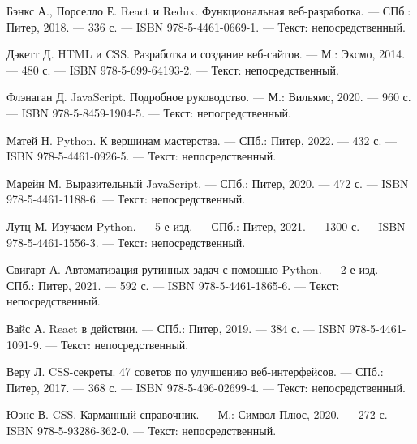 
\begin{thebibliography}{9}

     Бэнкс А., Порселло Е. React и Redux. Функциональная веб-разработка. — СПб.: Питер, 2018. — 336 с. — ISBN 978-5-4461-0669-1. — Текст: непосредственный.

     Дэкетт Д. HTML и CSS. Разработка и создание веб-сайтов. — М.: Эксмо, 2014. — 480 с. — ISBN 978-5-699-64193-2. — Текст: непосредственный.

     Флэнаган Д. JavaScript. Подробное руководство. — М.: Вильямс, 2020. — 960 с. — ISBN 978-5-8459-1904-5. — Текст: непосредственный.

     Матей Н. Python. К вершинам мастерства. — СПб.: Питер, 2022. — 432 с. — ISBN 978-5-4461-0926-5. — Текст: непосредственный.

     Марейн М. Выразительный JavaScript. — СПб.: Питер, 2020. — 472 с. — ISBN 978-5-4461-1188-6. — Текст: непосредственный.

     Лутц М. Изучаем Python. — 5-е изд. — СПб.: Питер, 2021. — 1300 с. — ISBN 978-5-4461-1556-3. — Текст: непосредственный.

     Свигарт А. Автоматизация рутинных задач с помощью Python. — 2-е изд. — СПб.: Питер, 2021. — 592 с. — ISBN 978-5-4461-1865-6. — Текст: непосредственный.

     Вайс А. React в действии. — СПб.: Питер, 2019. — 384 с. — ISBN 978-5-4461-1091-9. — Текст: непосредственный.

     Веру Л. CSS-секреты. 47 советов по улучшению веб-интерфейсов. — СПб.: Питер, 2017. — 368 с. — ISBN 978-5-496-02699-4. — Текст: непосредственный.

     Юэнс В. CSS. Карманный справочник. — М.: Символ-Плюс, 2020. — 272 с. — ISBN 978-5-93286-362-0. — Текст: непосредственный.

\end{thebibliography}